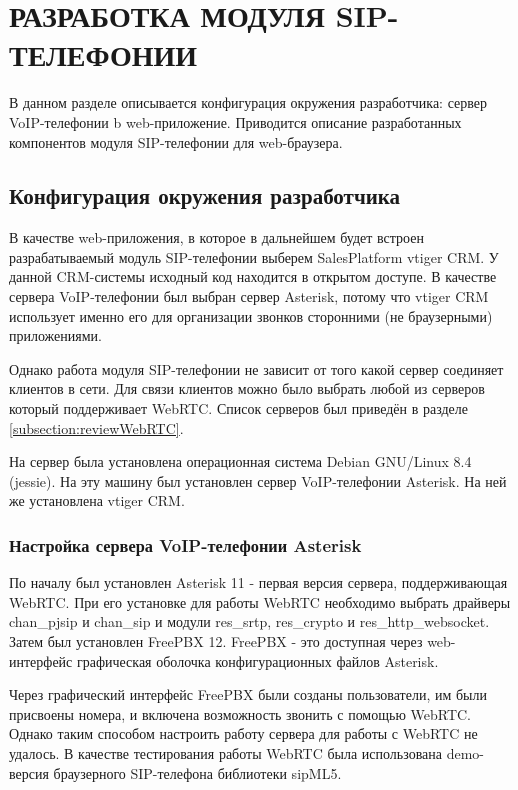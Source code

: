 \chapter{РАЗРАБОТКА МОДУЛЯ SIP-ТЕЛЕФОНИИ}

В данном разделе описывается конфигурация окружения разработчика: сервер VoIP-телефонии b web-приложение. Приводится описание разработанных компонентов модуля SIP-телефонии для web-браузера.

\section{Конфигурация окружения разработчика}
\label{section:config}

В качестве web-приложения, в которое в дальнейшем будет встроен разрабатываемый модуль SIP-телефонии выберем SalesPlatform vtiger CRM. У данной CRM-системы исходный код находится в открытом доступе. В качестве сервера VoIP-телефонии был выбран сервер Asterisk, потому что vtiger CRM использует именно его для организации звонков сторонними (не браузерными) приложениями.

Однако работа модуля SIP-телефонии не зависит от того какой сервер соединяет клиентов в сети. Для связи клиентов можно было выбрать любой из серверов который поддерживает WebRTC. Список серверов был приведён в разделе \ref{subsection:reviewWebRTC}.

На сервер была установлена операционная система Debian GNU/Linux 8.4 (jessie). На эту машину был установлен сервер VoIP-телефонии Asterisk. На ней же установлена vtiger CRM.

\subsection{Настройка сервера VoIP-телефонии Asterisk}

По началу был установлен Asterisk 11 - первая версия сервера, поддерживающая WebRTC.\cite{asterisk} При его установке для работы WebRTC необходимо выбрать драйверы chan\_pjsip и chan\_sip и модули res\_srtp, res\_crypto и res\_http\_websocket. Затем был установлен FreePBX 12. FreePBX - это доступная через web-интерфейс графическая оболочка конфигурационных файлов Asterisk.\cite{FreePBX}

Через графический интерфейс FreePBX были созданы пользователи, им были присвоены номера, и включена возможность звонить с помощью WebRTC. Однако таким способом настроить работу сервера для работы с WebRTC не удалось. В качестве тестирования работы WebRTC была использована demo-версия браузерного SIP-телефона библиотеки sipML5.

